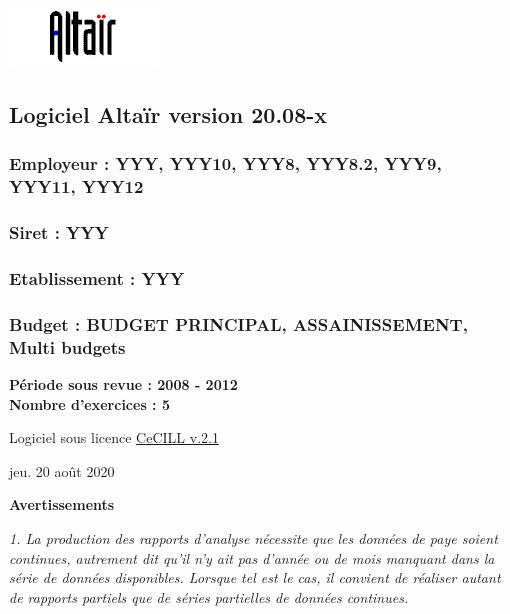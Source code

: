 \includegraphics{icones/altair.png}

\hypertarget{logiciel-altair-version-20.08-x}{%
\subsection{Logiciel Altaïr version
20.08-x}\label{logiciel-altair-version-20.08-x}}

\hypertarget{employeur-yyy-yyy10-yyy8-yyy8.2-yyy9-yyy11-yyy12}{%
\subsubsection{Employeur : YYY, YYY10, YYY8, YYY8.2, YYY9, YYY11,
YYY12}\label{employeur-yyy-yyy10-yyy8-yyy8.2-yyy9-yyy11-yyy12}}

\hypertarget{siret-yyy}{%
\subsubsection{Siret : YYY}\label{siret-yyy}}

\hypertarget{etablissement-yyy}{%
\subsubsection{Etablissement : YYY}\label{etablissement-yyy}}

\hypertarget{budget-budget-principal-assainissement-multi-budgets}{%
\subsubsection{Budget : BUDGET PRINCIPAL, ASSAINISSEMENT, Multi
budgets}\label{budget-budget-principal-assainissement-multi-budgets}}

\textbf{Période sous revue : 2008 - 2012 }\\
\textbf{Nombre d'exercices : 5 }

Logiciel sous licence \href{../Docs/LICENCE.html}{CeCILL v.2.1}

jeu. 20 août 2020

\textbf{Avertissements}

\emph{1. La production des rapports d'analyse nécessite que les données
de paye soient continues, autrement dit qu'il n'y ait pas d'année ou de
mois manquant dans la série de données disponibles. Lorsque tel est le
cas, il convient de réaliser autant de rapports partiels que de séries
partielles de données continues.}

